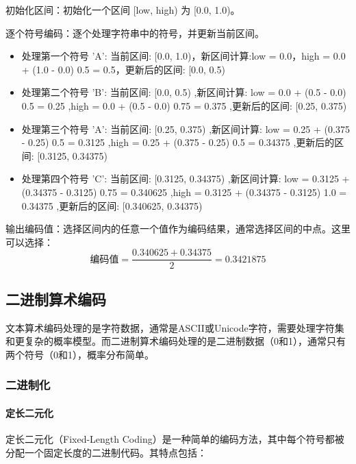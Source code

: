 \documentclass{/Users/hi/Study/template/code}
\begin{document}
\begin{tcolorbox}
\begin{serialNumber}
		\item 初始化区间：初始化一个区间 [low, high) 为 [0.0, 1.0)。
		\item 逐个符号编码：逐个处理字符串中的符号，并更新当前区间。
		\begin{equation}
			[low,high) \rightarrow  [low + (high - low)Symbol_{low} , low + ( high - low )Symbol_{high}]
		\end{equation}
		\begin{itemize}
			\item  处理第一个符号 'A': 当前区间: [0.0, 1.0)，新区间计算:low = 0.0，high = 0.0 + (1.0 - 0.0)  0.5 = 0.5，更新后的区间: [0.0, 0.5)
			\item  处理第二个符号 'B': 当前区间: [0.0, 0.5) ,新区间计算: low = 0.0 + (0.5 - 0.0)  0.5 = 0.25 ,high = 0.0 + (0.5 - 0.0)  0.75 = 0.375 ,更新后的区间: [0.25, 0.375)
			\item  处理第三个符号 'A': 当前区间: [0.25, 0.375) ,新区间计算: low = 0.25 + (0.375 - 0.25)  0.5 = 0.3125 ,high = 0.25 + (0.375 - 0.25)  0.5 = 0.34375 ,更新后的区间: [0.3125, 0.34375)
			\item  处理第四个符号 'C': 当前区间: [0.3125, 0.34375) ,新区间计算: low = 0.3125 + (0.34375 - 0.3125)  0.75 = 0.340625 ,high = 0.3125 + (0.34375 - 0.3125)  1.0 = 0.34375 ,更新后的区间: [0.340625, 0.34375)
		\end{itemize}

		\item 输出编码值：选择区间内的任意一个值作为编码结果，通常选择区间的中点。这里可以选择：
		\begin{equation}
			\text{编码值} = \frac{0.340625 + 0.34375}{2} = 0.3421875
		\end{equation}
	\end{serialNumber}
\end{tcolorbox}


\subsection{二进制算术编码}
文本算术编码处理的是字符数据，通常是ASCII或Unicode字符，需要处理字符集和更复杂的概率模型。而二进制算术编码处理的是二进制数据（0和1），通常只有两个符号（0和1），概率分布简单。

\subsubsection{二进制化}
\paragraph{定长二元化}
定长二元化（Fixed-Length Coding）是一种简单的编码方法，其中每个符号都被分配一个固定长度的二进制代码。其特点包括：
\end{document}
